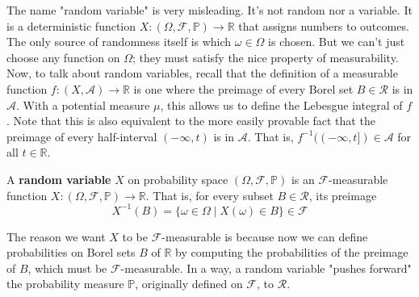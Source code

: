 \documentclass{article}
\begin{document}
    The name "random variable" is very misleading. It's not random nor a variable. It is a deterministic function $X: (\Omega, \mathcal{F}, \mathbb{P}) \longrightarrow \mathbb{R}$ that assigns numbers to outcomes. The only source of randomness itself is which $\omega \in \Omega$ is chosen. But we can't just choose any function on $\Omega$; they must satisfy the nice property of measurability. Now, to talk about random variables, recall that the definition of a measurable function $f: (X, \mathcal{A}) \longrightarrow \mathbb{R}$ is one where the preimage of every Borel set $B \in \mathcal{R}$ is in $\mathcal{A}$. With a potential measure $\mu$, this allows us to define the Lebesgue integral of $f$. Note that this is also equivalent to the more easily provable fact that the preimage of every half-interval $(-\infty, t)$ is in $\mathcal{A}$. That is, $f^{-1}((-\infty, t]) \in \mathcal{A}$ for all $t \in \mathbb{R}$. 

    \begin{definition}
      A \textbf{random variable} $X$ on probability space $(\Omega, \mathcal{F}, \mathbb{P})$ is an $\mathcal{F}$-measurable function $X: (\Omega, \mathcal{F}, \mathbb{P}) \longrightarrow \mathbb{R}$. That is, for every subset $B \in \mathcal{R}$, its preimage 
      \begin{equation}
        X^{-1} (B) = \{\omega \in \Omega \mid X(\omega) \in B\} \in \mathcal{F}
      \end{equation}
    \end{definition}

    The reason we want $X$ to be $\mathcal{F}$-measurable is because now we can define probabilities on Borel sets $B$ of $\mathbb{R}$ by computing the probabilities of the preimage of $B$, which must be $\mathcal{F}$-measurable. In a way, a random variable "pushes forward" the probability measure $\mathbb{P}$, originally defined on $\mathcal{F}$, to $\mathcal{R}$.  
\end{document}
